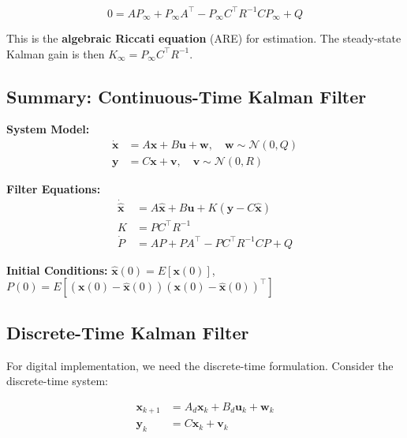 \begin{equation}
0 = AP_\infty + P_\infty A^\top - P_\infty C^\top R^{-1}CP_\infty + Q
\label{eq:algebraic_riccati}
\end{equation}

This is the \textbf{algebraic Riccati equation} (ARE) for estimation. The steady-state Kalman gain is then $K_\infty = P_\infty C^\top R^{-1}$.

\subsection{Summary: Continuous-Time Kalman Filter}

\begin{tcolorbox}[colback=blue!5!white,colframe=blue!75!black,title=Continuous-Time Kalman Filter,sharp corners]
\textbf{System Model:}
\begin{align*}
\dot{\mathbf{x}} &= A\mathbf{x} + B\mathbf{u} + \mathbf{w}, \quad \mathbf{w} \sim \mathcal{N}(0, Q) \\
\mathbf{y} &= C\mathbf{x} + \mathbf{v}, \quad \mathbf{v} \sim \mathcal{N}(0, R)
\end{align*}

\textbf{Filter Equations:}
\begin{align*}
\dot{\hat{\mathbf{x}}} &= A\hat{\mathbf{x}} + B\mathbf{u} + K(\mathbf{y} - C\hat{\mathbf{x}}) \\
K &= PC^\top R^{-1} \\
\dot{P} &= AP + PA^\top - PC^\top R^{-1}CP + Q
\end{align*}

\textbf{Initial Conditions:} $\hat{\mathbf{x}}(0) = E[\mathbf{x}(0)]$, $P(0) = E[(\mathbf{x}(0) - \hat{\mathbf{x}}(0))(\mathbf{x}(0) - \hat{\mathbf{x}}(0))^\top]$
\end{tcolorbox}

\subsection{Discrete-Time Kalman Filter}

For digital implementation, we need the discrete-time formulation. Consider the discrete-time system:

\begin{equation}
\begin{aligned}
\mathbf{x}_{k+1} &= A_d\mathbf{x}_k + B_d\mathbf{u}_k + \mathbf{w}_k \\
\mathbf{y}_k &= C\mathbf{x}_k + \mathbf{v}_k
\end{aligned}
\end{equation}

